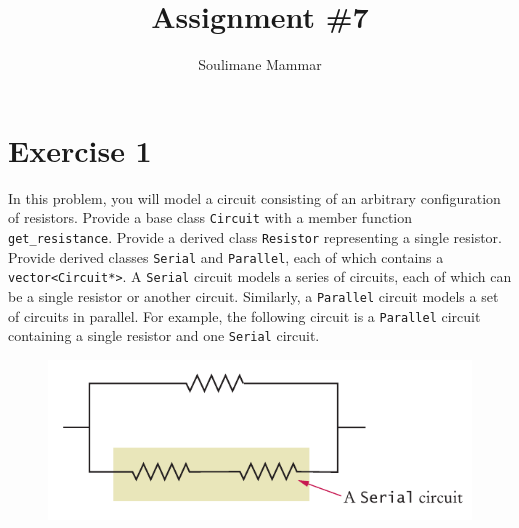 \documentclass[10pt,a4paper]{article}
\title{Assignment \#7}
\author{Soulimane Mammar}
\begin{document}
	\maketitle
	
	\section*{Exercise 1}
	In this problem, you will model a circuit consisting of an arbitrary configuration of resistors. Provide a base class \verb|Circuit| with a member function \verb|get_resistance|. Provide a derived class \verb|Resistor| representing a single resistor. Provide derived classes \verb|Serial| and \verb|Parallel|, each of which contains a \verb|vector<Circuit*>|. A \verb|Serial| circuit models a series of circuits, each of which can be a single resistor or another circuit. Similarly, a \verb|Parallel| circuit models a set of circuits in parallel. For example, the following circuit is a \verb|Parallel| circuit containing a single resistor and one \verb|Serial| circuit.
	\begin{figure}[H]
		\centering
		\includegraphics[width=0.7\linewidth]{circuit}
	\end{figure}
	
\end{document}

